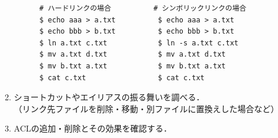 \begin{enumerate}
\begin{enumerate}
    \begin{lstlisting}
      # ハードリンクの場合          # シンボリックリンクの場合
      $ echo aaa > a.txt          $ echo aaa > a.txt
      $ echo bbb > b.txt          $ echo bbb > b.txt
      $ ln a.txt c.txt            $ ln -s a.txt c.txt
      $ mv a.txt d.txt            $ mv a.txt d.txt
      $ mv b.txt a.txt            $ mv b.txt a.txt
      $ cat c.txt                 $ cat c.txt
    \end{lstlisting} %
  \item ショートカットやエイリアスの振る舞いを調べる．\\
    （リンク先ファイルを削除・移動・別ファイルに置換えした場合など）
  \item ACLの追加・削除とその効果を確認する．
  \end{enumerate}
\end{enumerate}
